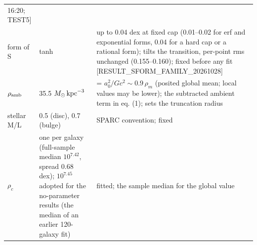\documentclass[
  10pt,
]{article}
\begin{document}
\begin{longtable}[]{@{}lll@{}}
\begin{minipage}[t]{0.50\columnwidth}
16:20; TEST5{]}\strut
\end{minipage}\tabularnewline
\begin{minipage}[t]{0.24\columnwidth}\raggedright
form of S\strut
\end{minipage} & \begin{minipage}[t]{0.20\columnwidth}\raggedright
tanh\strut
\end{minipage} & \begin{minipage}[t]{0.50\columnwidth}\raggedright
up to 0.04 dex at fixed cap (0.01--0.02 for erf and exponential forms, 0.04 for a hard cap or a rational form); tilts the transition, per-point rms unchanged (0.155--0.160); fixed before any fit {[}RESULT\_SFORM\_FAMILY\_20261028{]}\strut
\end{minipage}\tabularnewline
\begin{minipage}[t]{0.24\columnwidth}\raggedright
$\rho_{\rm amb}$\strut
\end{minipage} & \begin{minipage}[t]{0.20\columnwidth}\raggedright
35.5 $M_\odot\,{\rm kpc}^{-3}$\strut
\end{minipage} & \begin{minipage}[t]{0.50\columnwidth}\raggedright
= $a_0^2/Gc^2\sim 0.9\,\rho_m$ (posited global mean; local values may be lower); the subtracted ambient
term in eq. (1); sets the truncation radius\strut
\end{minipage}\tabularnewline
\begin{minipage}[t]{0.24\columnwidth}\raggedright
stellar M/L\strut
\end{minipage} & \begin{minipage}[t]{0.20\columnwidth}\raggedright
0.5 (disc), 0.7 (bulge)\strut
\end{minipage} & \begin{minipage}[t]{0.50\columnwidth}\raggedright
SPARC convention; fixed\strut
\end{minipage}\tabularnewline
\begin{minipage}[t]{0.24\columnwidth}\raggedright
$\rho_c$\strut
\end{minipage} & \begin{minipage}[t]{0.20\columnwidth}\raggedright
one per galaxy (full-sample median $10^{7.42}$, spread 0.68 dex); $10^{7.45}$ adopted for the no-parameter
results (the median of an earlier 120-galaxy fit)\strut
\end{minipage} & \begin{minipage}[t]{0.50\columnwidth}\raggedright
fitted; the sample median for the global value\strut

\end{minipage}
\end{longtable}
\end{document}
